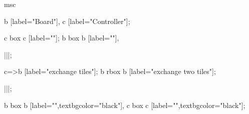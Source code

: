 \begin{msc}
msc
{

b [label="Board"],
c [label="Controller"];

c box c [label=""];
b box b [label=""],

|||;

c=>b [label="exchange tiles"];
b rbox b [label="exchange two tiles"];

|||;

b box b [label="",textbgcolor="black"],
c box c [label="",textbgcolor="black"];

}
\end{msc}
